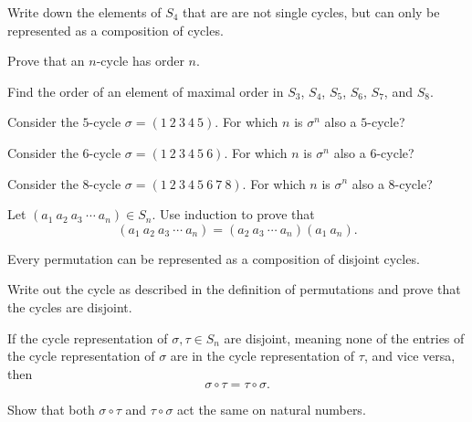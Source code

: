 \documentclass{ximera}
\begin{document}
\begin{exercise}
  Write down the elements of $S_4$ that are are not single cycles, but
  can only be represented as a composition of cycles.
\end{exercise}



\begin{exercise}
  Prove that an $n$-cycle has order $n$.
\end{exercise}

\begin{exercise}
  Find the order of an element of maximal order in $S_3$, $S_4$,
  $S_5$, $S_6$, $S_7$, and $S_8$.
\end{exercise}


\begin{exercise}
  Consider the $5$-cycle $\sigma=(1 \ 2\ 3\ 4\ 5 )$. For which $n$ is
  $\sigma^n$ also a $5$-cycle?
\end{exercise}


\begin{exercise}
  Consider the $6$-cycle $\sigma=(1 \ 2\ 3\ 4\ 5 \ 6)$. For which $n$ is
  $\sigma^n$ also a $6$-cycle?
\end{exercise}


\begin{exercise}
  Consider the $8$-cycle $\sigma=(1 \ 2\ 3\ 4\ 5 \ 6 \ 7 \ 8)$. For which $n$ is
  $\sigma^n$ also a $8$-cycle?
\end{exercise}





\begin{exercise}
  Let $(a_1 \ a_2 \ a_3 \ \cdots \ a_{n})\in S_n$. Use induction to
  prove that
  \[
  (a_1 \ a_2 \ a_3 \ \cdots \ a_{n}) = (a_2 \ a_3 \ \cdots \ a_{n}) (a_1 \ a_{n}). 
  \]
\end{exercise}


\begin{lemma}\label{L:CC}
  Every permutation can be represented as a composition of disjoint
  cycles.
  \begin{sketch}
    Write out the cycle as described in the definition of permutations
    and prove that the cycles are disjoint.
  \end{sketch}
\end{lemma}

\begin{lemma}
  If the cycle representation of $\sigma,\tau\in S_n$ are disjoint,
  meaning none of the entries of the cycle representation of $\sigma$
  are in the cycle representation of $\tau$, and vice versa, then
  \[
  \sigma \circ \tau = \tau \circ \sigma.
  \]
  \begin{sketch}
    Show that both $\sigma \circ \tau$ and $\tau \circ \sigma$ act the
    same on natural numbers.
  \end{sketch} 
\end{lemma}
\end{document}
